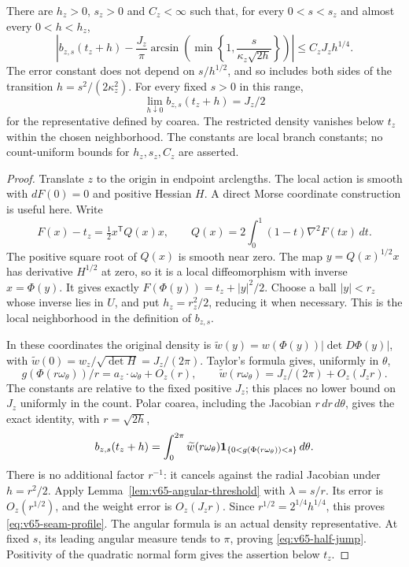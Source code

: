 \begin{theorem}
\label{thm:v65-seam-profile}
There are $h_z>0$, $s_z>0$ and $C_z<\infty$ such that, for every
$0<s<s_z$ and almost every $0<h<h_z$,
\begin{equation}\label{eq:v65-seam-profile}
 \left|b_{z,s}(t_z+h)
       -\frac{J_z}{\pi}
          \arcsin\!\left(\min\left\{1,
                 \frac{s}{\kappa_z\sqrt{2h}}\right\}\right)\right|
            \le C_zJ_z h^{1/4}.
\end{equation}
The error constant does not depend on $s/h^{1/2}$, and so includes
both sides of the transition $h=s^2/(2\kappa_z^2)$.
For every fixed $s>0$ in this range,
\begin{equation}\label{eq:v65-half-jump}
 \lim_{h\downarrow0}b_{z,s}(t_z+h)=J_z/2
\end{equation}
for the representative defined by coarea. The restricted density
vanishes below $t_z$ within the chosen neighborhood.
The constants are local branch constants; no count-uniform bounds
for $h_z,s_z,C_z$ are asserted.
\end{theorem}
\begin{proof}
Translate $z$ to the origin in endpoint arclengths. The local action
is smooth with $dF(0)=0$ and positive Hessian $H$. A direct Morse
coordinate construction is useful here. Write
\[
 F(x)-t_z=\tfrac12x^{\mathsf T}Q(x)x,\qquad
 Q(x)=2\int_0^1(1-t)\nabla^2F(tx)\,dt.
\]
The positive square root of $Q(x)$ is smooth near zero. The map
$y=Q(x)^{1/2}x$ has derivative $H^{1/2}$ at zero, so it is a
local diffeomorphism with inverse $x=\Phi(y)$. It gives exactly
$F(\Phi(y))=t_z+|y|^2/2$. Choose a ball $|y|<r_z$ whose inverse
lies in $U$, and put $h_z=r_z^2/2$, reducing it when necessary.
This is the local neighborhood in the definition of $b_{z,s}$.

In these coordinates the original density is
$\widetilde w(y)=w(\Phi(y))|\det D\Phi(y)|$, with
$\widetilde w(0)=w_z/\sqrt{\det H}=J_z/(2\pi)$. Taylor's formula
gives, uniformly in $\theta$,
\[
 g(\Phi(r\omega_\theta))/r
       =a_z\cdot\omega_\theta+O_z(r),\qquad
 \widetilde w(r\omega_\theta)=J_z/(2\pi)+O_z(J_zr).
\]
The constants are relative to the fixed positive $J_z$; this places
no lower bound on $J_z$ uniformly in the count.
Polar coarea, including the Jacobian $r\,dr\,d\theta$, gives the
exact identity, with $r=\sqrt{2h}$,
\begin{equation}\label{eq:v65-polar-source}
 b_{z,s}(t_z+h)
    =\int_0^{2\pi}\widetilde w(r\omega_\theta)
             \one_{\{0<g(\Phi(r\omega_\theta))<s\}}\,d\theta.
\end{equation}
There is no additional factor $r^{-1}$: it cancels against the radial
Jacobian under $h=r^2/2$. Apply
Lemma~\ref{lem:v65-angular-threshold} with $\lambda=s/r$.
Its error is $O_z(r^{1/2})$, and the weight error is $O_z(J_zr)$.
Since $r^{1/2}=2^{1/4}h^{1/4}$, this proves
\eqref{eq:v65-seam-profile}. The angular formula is an actual density
representative. At fixed $s$, its leading angular measure tends to
$\pi$, proving \eqref{eq:v65-half-jump}. Positivity of the quadratic
normal form gives the assertion below $t_z$.
\end{proof}

